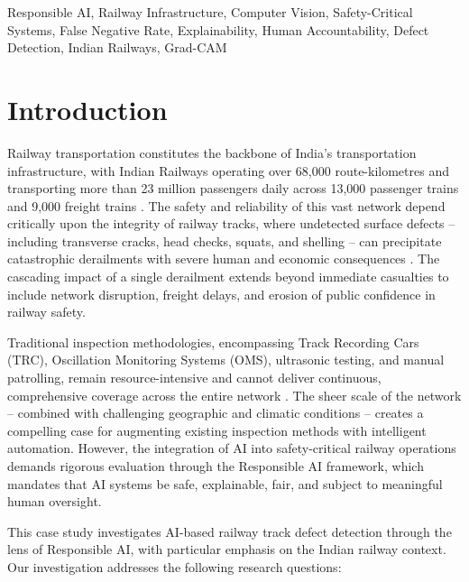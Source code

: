 \documentclass[conference]{IEEE}
\begin{document}
\begin{IEEEkeywords}
Responsible AI, Railway Infrastructure, Computer Vision, Safety-Critical Systems, False Negative Rate, Explainability, Human Accountability, Defect Detection, Indian Railways, Grad-CAM
\end{IEEEkeywords}

\section{Introduction}

Railway transportation constitutes the backbone of India's transportation infrastructure, with Indian Railways operating over 68,000 route-kilometres and transporting more than 23 million passengers daily across 13,000 passenger trains and 9,000 freight trains \cite{pib2017}. The safety and reliability of this vast network depend critically upon the integrity of railway tracks, where undetected surface defects -- including transverse cracks, head checks, squats, and shelling -- can precipitate catastrophic derailments with severe human and economic consequences \cite{khajeh2025}. The cascading impact of a single derailment extends beyond immediate casualties to include network disruption, freight delays, and erosion of public confidence in railway safety.

Traditional inspection methodologies, encompassing Track Recording Cars (TRC), Oscillation Monitoring Systems (OMS), ultrasonic testing, and manual patrolling, remain resource-intensive and cannot deliver continuous, comprehensive coverage across the entire network \cite{rdso2020}. The sheer scale of the network -- combined with challenging geographic and climatic conditions -- creates a compelling case for augmenting existing inspection methods with intelligent automation. However, the integration of AI into safety-critical railway operations demands rigorous evaluation through the Responsible AI framework, which mandates that AI systems be safe, explainable, fair, and subject to meaningful human oversight.

This case study investigates AI-based railway track defect detection through the lens of Responsible AI, with particular emphasis on the Indian railway context. Our investigation addresses the following research questions:
\end{document}

